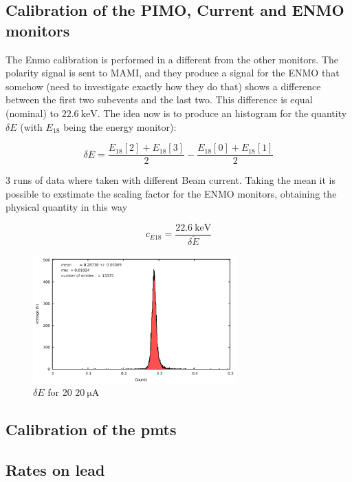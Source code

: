 \subsection{Calibration of the PIMO, Current and ENMO monitors}

The Enmo calibration is performed in a different from the other monitors. The polarity signal is sent to MAMI, and they produce a signal for the ENMO that somehow (need to investigate exactly how they do that) shows a difference between the first two subevents and the last two. This difference is equal (nominal) to $\SI{22.6}{\kilo \electronvolt}$. The idea now is to produce an histogram for the quantity $\delta E$ (with $E_{18}$ being the energy monitor):

\begin{equation*}
\delta E = \frac{E_{18}[2] + E_{18}[3]}{2} - \frac{E_{18}[0] + E_{18}[1]}{2} 
\end{equation*}

3 runs of data where taken with different Beam current. Taking the mean it is possible to exstimate the scaling factor for the ENMO monitors, obtaining the physical quantity in this way

\begin{equation*}
c_{E18} = \frac{\SI{22.6}{\kilo \electronvolt}}{\overline{\delta E}}
\end{equation*}

\begin{figure}[hbtp]
\centering
\includegraphics[width = 0.7\textwidth]{Analysis/Enmo_Calibration.pdf}
\caption{$\delta E$ for 20 $\SI{20}{\micro \ampere}$}
\end{figure}


\subsection{Calibration of the pmts}

\subsection{Rates on lead}

